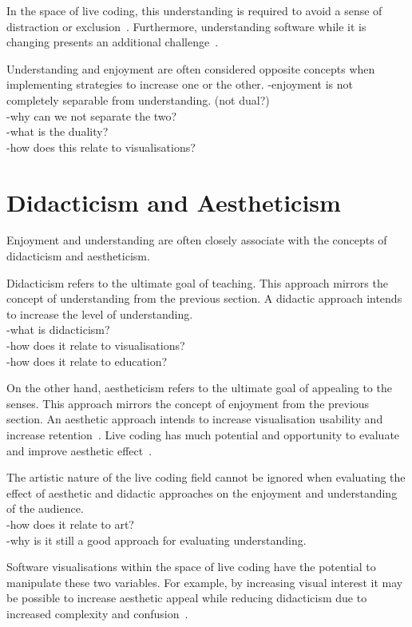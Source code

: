 In the space of live coding, this understanding is required to avoid a sense of distraction or exclusion~\cite{McLean2010a}. Furthermore, understanding software while it is changing presents an additional challenge~\cite{Eisenbarth2003}.

Understanding and enjoyment are often considered opposite concepts when implementing strategies to increase one or the other. 
-enjoyment is not completely separable from understanding. (not dual?)\\
-why can we not separate the two?\\
-what is the duality?\\
-how does this relate to visualisations?

\section{Didacticism and Aestheticism}

Enjoyment and understanding are often closely associate with the concepts of didacticism and aestheticism.

Didacticism refers to the ultimate goal of teaching. This approach mirrors the concept of understanding from the previous section. A didactic approach intends to increase the level of understanding.\\
-what is didacticism?\\
-how does it relate to visualisations?\\
-how does it relate to education?

On the other hand, aestheticism refers to the ultimate goal of appealing to the senses. This approach mirrors the concept of enjoyment from the previous section. An aesthetic approach intends to increase visualisation usability and increase retention~\cite{Cawthon2007}. Live coding has much potential and opportunity to evaluate and improve aesthetic effect~\cite{Bell}.

The artistic nature of the live coding field cannot be ignored when evaluating the effect of aesthetic and didactic approaches on the enjoyment and understanding of the audience.\\
-how does it relate to art?\\
-why is it still a good approach for evaluating understanding.

Software visualisations within the space of live coding have the potential to manipulate these two variables. For example, by increasing visual interest it may be possible to increase aesthetic appeal while reducing didacticism due to increased complexity and confusion~.

